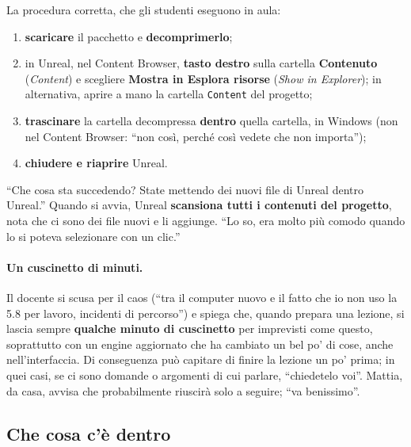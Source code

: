 La procedura corretta, che gli studenti eseguono in aula:
\begin{enumerate}
  \item \textbf{scaricare} il pacchetto e \textbf{decomprimerlo};
  \item in Unreal, nel Content Browser, \textbf{tasto destro} sulla cartella
        \textbf{Contenuto} (\emph{Content}) e scegliere \textbf{Mostra in
        Esplora risorse} (\emph{Show in Explorer}); in alternativa, aprire a
        mano la cartella \texttt{Content} del progetto;
  \item \textbf{trascinare} la cartella decompressa \textbf{dentro} quella
        cartella, in Windows (non nel Content Browser: ``non così, perché così
        vedete che non importa'');
  \item \textbf{chiudere e riaprire} Unreal.
\end{enumerate}
``Che cosa sta succedendo? State mettendo dei nuovi file di Unreal dentro
Unreal.'' Quando si avvia, Unreal \textbf{scansiona tutti i contenuti del
progetto}, nota che ci sono dei file nuovi e li aggiunge. ``Lo so, era molto più
comodo quando lo si poteva selezionare con un clic.''

\paragraph{Un cuscinetto di minuti.} Il docente si scusa per il caos (``tra il
computer nuovo e il fatto che io non uso la 5.8 per lavoro, incidenti di
percorso'') e spiega che, quando prepara una lezione, si lascia sempre
\textbf{qualche minuto di cuscinetto} per imprevisti come questo, soprattutto
con un engine aggiornato che ha cambiato un bel po' di cose, anche
nell'interfaccia. Di conseguenza può capitare di finire la lezione un po' prima;
in quei casi, se ci sono domande o argomenti di cui parlare, ``chiedetelo voi''.
Mattia, da casa, avvisa che probabilmente riuscirà solo a seguire; ``va
benissimo''.

\subsection{Che cosa c'è dentro}


